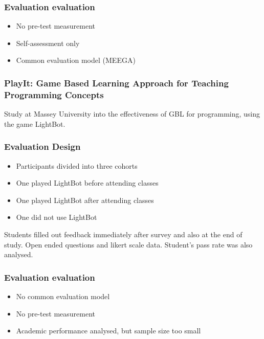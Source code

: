 \documentclass{beamer}
\begin{document}
\begin{frame}
  \frametitle{Evaluation evaluation}
  \begin{itemize}
    \item No pre-test measurement
    \item Self-assessment only
    \item Common evaluation model (MEEGA)
  \end{itemize}
\end{frame}
\begin{frame}
  \frametitle{PlayIt: Game Based Learning Approach for Teaching Programming Concepts}
  Study at Massey University into the effectiveness of GBL for programming, using the game LightBot.
\end{frame}
\begin{frame}
  \frametitle{Evaluation Design}
  \begin{itemize}
    \item Participants divided into three cohorts
    \item One played LightBot before attending classes
    \item One played LightBot after attending classes
    \item One did not use LightBot
  \end{itemize}
  Students filled out feedback immediately after survey and also at the end of study. Open ended questions and likert scale data. Student's pass rate was also analysed.
\end{frame}
\begin{frame}
  \frametitle{Evaluation evaluation}
  \begin{itemize}
    \item No common evaluation model
    \item No pre-test measurement
    \item Academic performance analysed, but sample size too small
  \end{itemize}
\end{frame}
\end{document}
